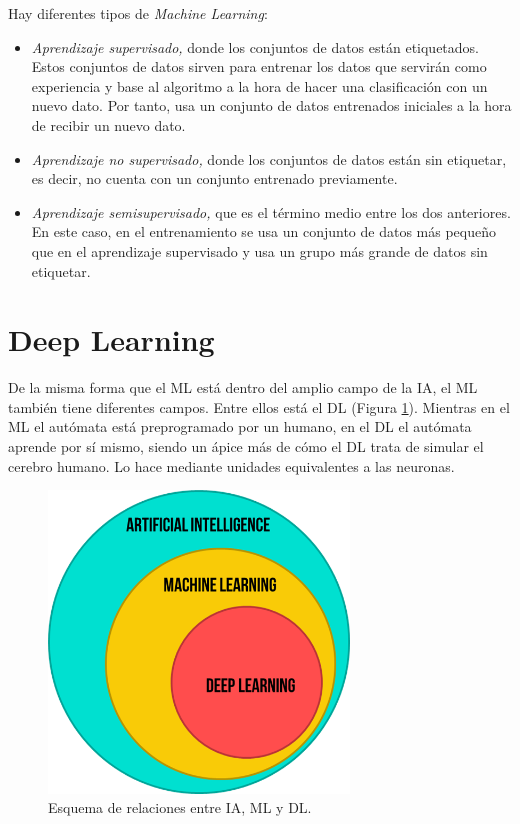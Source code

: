 Hay diferentes tipos de \textit{Machine Learning}:
\begin{itemize}
 \item \textit{Aprendizaje supervisado,} donde los conjuntos de datos están etiquetados. Estos conjuntos de datos sirven para entrenar los datos que servirán como experiencia y base al algoritmo a la hora de hacer una clasificación con un nuevo dato. Por tanto, usa un conjunto de datos entrenados iniciales a la hora de recibir un nuevo dato.
 \item \textit{Aprendizaje no supervisado,} donde los conjuntos de datos están sin etiquetar, es decir, no cuenta con un conjunto entrenado previamente.
 \item \textit{Aprendizaje semisupervisado,} que es el término medio entre los dos anteriores. En este caso, en el entrenamiento se usa un conjunto de datos más pequeño que en el aprendizaje supervisado y usa un grupo más grande de datos sin etiquetar.
\end{itemize}

\section{Deep Learning}
De la misma forma que el ML está dentro del amplio campo de la IA, el ML también tiene diferentes campos. Entre ellos está el DL (Figura \ref{fig:ia-ml-dl}). Mientras en el ML el autómata está preprogramado por un humano, en el DL el autómata aprende por sí mismo, siendo un ápice más de cómo el DL trata de simular el cerebro humano. Lo hace mediante unidades equivalentes a las neuronas.\\
\begin{figure} [h!]
  \begin{center}
    \includegraphics[width=8cm]{figs/ia-ml-dl}
  \end{center}
  \caption{Esquema de relaciones entre IA, ML y DL.}
  \label{fig:ia-ml-dl}
\end{figure}

